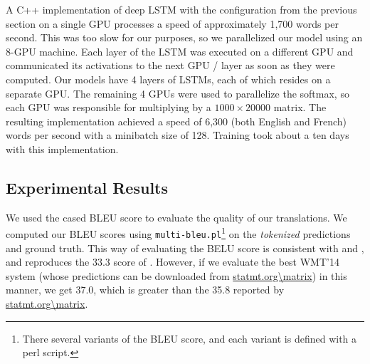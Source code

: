 A C++ implementation of deep LSTM with the configuration from the
previous section on a single GPU processes a speed of approximately
1,700 words per second.  This was too slow for our purposes, so we 
parallelized our model using an 8-GPU machine.  Each layer of the LSTM
was executed on a different GPU and communicated its activations
to the next GPU / layer as soon as they were computed.  Our models
have 4 layers of LSTMs, each of which resides on a separate GPU.  The remaining
4 GPUs were used to parallelize the softmax, so each GPU was
responsible for multiplying by a $1000\times 20000$ matrix.  The
resulting implementation achieved a speed of 6,300 (both English and
French) words per second with a minibatch size of 128. 
Training took about a ten days with this implementation.


\subsection{Experimental Results}

We used the cased BLEU score \cite{bleu} to evaluate the quality of our
translations. We computed our BLEU scores using \texttt{multi-bleu.pl}\footnote{
There several variants of the BLEU score, and each variant is defined  with a perl script. } 
on the \emph{tokenized} predictions and ground truth.
This way of evaluating the BELU score is consistent with \cite{cho14} and \cite{bog14}, and reproduces
the 33.3 score of \cite{wmt14_en_fr}.
However, if we evaluate the best WMT'14 system \cite{durrani-EtAl:2014:W14-33}
(whose predictions can be downloaded from \url{statmt.org\matrix}) in this manner, we get   
37.0, which is greater than the 35.8 reported by \url{statmt.org\matrix}.  





